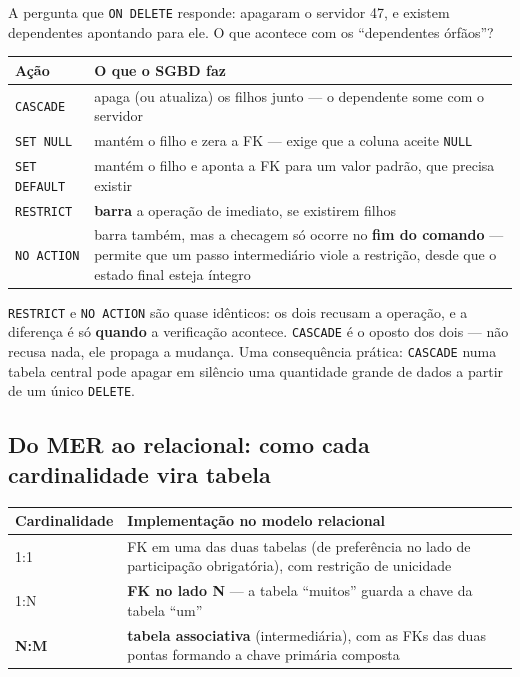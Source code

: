 \begin{conceito}
A pergunta que \texttt{ON DELETE} responde: apagaram o servidor 47, e
existem dependentes apontando para ele. O que acontece com os
“dependentes órfãos”?

\begin{center}
\begin{tabular}{@{}p{2.8cm}p{9.2cm}@{}}
\toprule
\textbf{Ação} & \textbf{O que o SGBD faz} \\
\midrule
\texttt{CASCADE} & apaga (ou atualiza) os filhos junto --- o dependente
some com o servidor \\
\texttt{SET NULL} & mantém o filho e zera a FK --- exige que a coluna
aceite \texttt{NULL} \\
\texttt{SET DEFAULT} & mantém o filho e aponta a FK para um valor padrão,
que precisa existir \\
\texttt{RESTRICT} & \textbf{barra} a operação de imediato, se existirem
filhos \\
\texttt{NO ACTION} & barra também, mas a checagem só ocorre no \textbf{fim
do comando} --- permite que um passo intermediário viole a restrição,
desde que o estado final esteja íntegro \\
\bottomrule
\end{tabular}
\end{center}

\texttt{RESTRICT} e \texttt{NO ACTION} são quase idênticos: os dois
recusam a operação, e a diferença é só \textbf{quando} a verificação
acontece. \texttt{CASCADE} é o oposto dos dois --- não recusa nada, ele
propaga a mudança. Uma consequência prática: \texttt{CASCADE} numa tabela
central pode apagar em silêncio uma quantidade grande de dados a partir de
um único \texttt{DELETE}.
\end{conceito}

\subsection{Do MER ao relacional: como cada cardinalidade vira tabela}

\begin{conceito}
\begin{center}
\begin{tabular}{@{}p{2.2cm}p{9.8cm}@{}}
\toprule
\textbf{Cardinalidade} & \textbf{Implementação no modelo relacional} \\
\midrule
1:1 & FK em uma das duas tabelas (de preferência no lado de participação
obrigatória), com restrição de unicidade \\
1:N & \textbf{FK no lado N} --- a tabela “muitos” guarda a chave da tabela
“um” \\
\textbf{N:M} & \textbf{tabela associativa} (intermediária), com as FKs das
duas pontas formando a chave primária composta \\
\bottomrule
\end{tabular}
\end{center}
\end{conceito}

